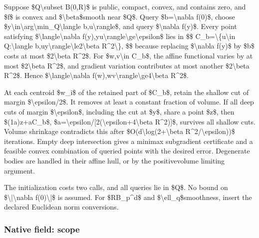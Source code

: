 \documentclass[10pt,a4paper]{article}
\begin{document}
Suppose \$Q\textbackslash{}subset B(0,R)\$ is public, compact, convex, and contains zero, and \$f\$ is convex and \$\textbackslash{}beta\$smooth near \$Q\$. Query \$b=\textbackslash{}nabla f(0)\$, choose \$y\textbackslash{}in\textbackslash{}arg\textbackslash{}min\_Q\textbackslash{}langle b,u\textbackslash{}rangle\$, and query \$\textbackslash{}nabla f(y)\$. Every point satisfying \$\textbackslash{}langle\textbackslash{}nabla f(y),yu\textbackslash{}rangle\textbackslash{}ge\textbackslash{}epsilon\$ lies in
\$\$
C\_b=\textbackslash{}\{u\textbackslash{}in Q:\textbackslash{}langle b,uy\textbackslash{}rangle\textbackslash{}le2\textbackslash{}beta R\textasciicircum{}2\textbackslash{}\},
\$\$
because replacing \$\textbackslash{}nabla f(y)\$ by \$b\$ costs at most \$2\textbackslash{}beta R\textasciicircum{}2\$. For \$w,v\textbackslash{}in C\_b\$, the affine functional varies by at most \$2\textbackslash{}beta R\textasciicircum{}2\$, and gradient variation contributes at most another \$2\textbackslash{}beta R\textasciicircum{}2\$. Hence \$\textbackslash{}langle\textbackslash{}nabla f(w),wv\textbackslash{}rangle\textbackslash{}ge4\textbackslash{}beta R\textasciicircum{}2\$.

At each centroid \$w\_i\$ of the retained part of \$C\_b\$, retain the shallow cut of margin \$\textbackslash{}epsilon/2\$. It removes at least a constant fraction of volume. If all deep cuts of margin \$\textbackslash{}epsilon\$, including the cut at \$y\$, share a point \$z\$, then
\$(1a)z+aC\_b\$, \$a=\textbackslash{}epsilon/[2(\textbackslash{}epsilon+4\textbackslash{}beta R\textasciicircum{}2)]\$, survives all shallow cuts. Volume shrinkage contradicts this after \$O(d\textbackslash{}log(2+\textbackslash{}beta R\textasciicircum{}2/\textbackslash{}epsilon))\$ iterations. Empty deep intersection gives a minimax subgradient certificate and a feasible convex combination of queried points with the desired error. Degenerate bodies are handled in their affine hull, or by the positivevolume limiting argument.

The initialization costs two calls, and all queries lie in \$Q\$. No bound on \$\textbackslash{}|\textbackslash{}nabla f(0)\textbackslash{}|\$ is assumed. For \$RB\_p\textasciicircum{}d\$ and \$\textbackslash{}ell\_q\$smoothness, insert the declared Euclidean norm conversions.


\subsubsection{Native field: scope}
\end{document}
